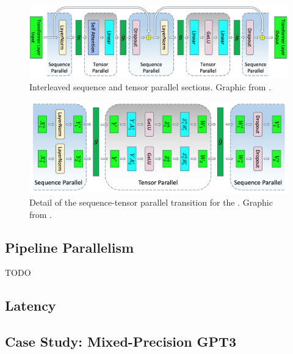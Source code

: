 \documentclass[11pt]{article}
\begin{document}
\begin{figure}[ht]
 \centering
 \includegraphics[scale=.25]{figures/transformer-tensor-sequence-parallel.jpg}
 \caption{Interleaved sequence and tensor parallel sections. Graphic from
 \cite{shoeybi2020megatronlm}. }
 \label{fig_tensor_seq_parallel}
\end{figure}

\begin{figure}[ht]
 \centering
 \includegraphics[scale=.25]{figures/mlp-tensor-sequence-parallel.jpg}
 \caption{Detail of the sequence-tensor parallel transition for the  . Graphic from
 \cite{shoeybi2020megatronlm}. }
 \label{fig_tensor_seq_parallel_detail}
\end{figure}


\subsection{Pipeline Parallelism \label{subsec_pipe_parallelism}}

TODO






\subsection{Latency \label{sec_latency_train} }

\subsection{Case Study: Mixed-Precision GPT3 \label{subsec_gpt_mem_study} }
\end{document}
